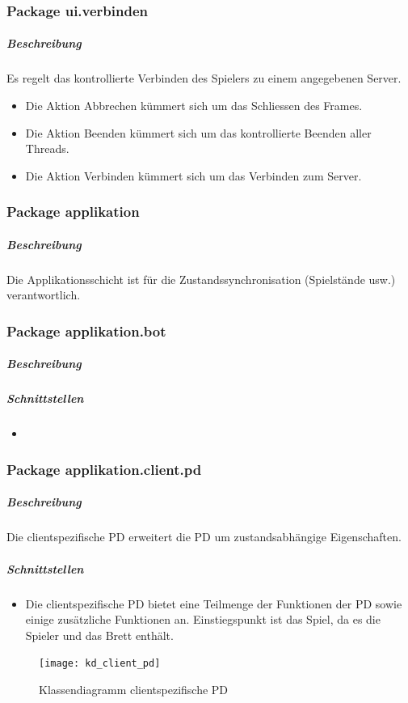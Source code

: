 \documentclass[12pt,halfparskip]{scrartcl}
\begin{document}
\subsubsection{Package ui.verbinden}
\label{ssub:package_ui_verbinden}
\subparagraph{Beschreibung}
Es regelt das kontrollierte Verbinden des Spielers zu einem angegebenen Server.

\begin{itemize}
	\item Die Aktion Abbrechen kümmert sich um das Schliessen des Frames.
	\item Die Aktion Beenden kümmert sich um das kontrollierte Beenden aller Threads.
	\item Die Aktion Verbinden kümmert sich um das Verbinden zum Server.
\end{itemize}

\clearpage
\subsubsection{Package applikation}
\label{ssub:package_applikation}
\subparagraph{Beschreibung}
Die Applikationsschicht ist für die Zustandssynchronisation (Spielstände usw.) verantwortlich.

\subsubsection{Package applikation.bot}
\label{ssub:package_applikation_bot}
\subparagraph{Beschreibung}

\subparagraph{Schnittstellen}
\begin{itemize}
	\item 
\end{itemize}

\subsubsection{Package applikation.client.pd}
\subparagraph{Beschreibung}
Die clientspezifische PD erweitert die PD um zustandsabhängige Eigenschaften.

\subparagraph{Schnittstellen}
\begin{itemize}
	\item Die clientspezifische PD bietet eine Teilmenge der Funktionen der PD sowie einige zusätzliche Funktionen an. Einstiegspunkt ist das Spiel, da es die Spieler und das Brett enthält.
\end{itemize}

\begin{figure}[h]
	\centering
	\texttt{[image: kd\_client\_pd]}
	\caption{Klassendiagramm clientspezifische PD}
	\label{fig:kd_client_pd}
\end{figure}
\end{document}
